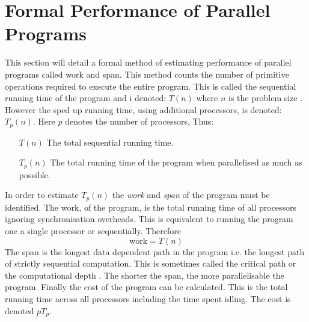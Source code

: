 \section{Formal Performance of Parallel Programs}
This section will detail a formal method of estimating performance of parallel programs called work and span. This method counts the number of primitive operations required to execute the entire program. This is called the sequential running time of the program and i denoted: $T(n)$ where $n$ is the problem size \cite{DBLP:books/daglib/para-algo}. However the sped up running time, using additional processors, is denoted: $T_p(n)$. Here $p$ denotes the number of processors, Thus:
\begin{itemize}
    \item[$T(n)$] The total sequential running time.
    \item[$T_p(n)$] The total running time of the program when parallelised as much as possible.
\end{itemize}
In order to estimate $T_p(n)$ the \textit{work} and \textit{span} of the program must be identified. The work, of the program, is the total running time of all processors ignoring synchronisation overheads. This is equivalent to running the program one a single processor or sequentially. Therefore
\begin{equation}
    \text{work} = T(n)
\end{equation}
The span is the longest data dependent path in the program i.e. the longest path of strictly sequential computation. This is sometimes called the critical path or the computational depth \cite{Blelloch:1996:PPA:prog-para-algo}. The shorter the span, the more parallelisable the program. Finally the cost of the program can be calculated. This is the total running time across all processors including the time spent idling. The cost is denoted $pT_p$.

